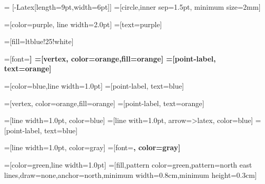\usetikzlibrary{positioning,arrows.meta,shapes,calc,patterns}

 = [-{Latex[length=9pt,width=6pt]}]
=[circle,inner sep=1.5pt, minimum size=2mm]

=[color=purple, line width=2.0pt]
=[text=purple]

=[fill=ltblue!25!white]

=[font=\bfseries]
=[vertex, color=orange,fill=orange]
=[point-label, text=orange]

=[color=blue,line width=1.0pt]
=[point-label, text=blue]


=[vertex, color=orange,fill=orange]
=[point-label, text=orange]

=[line width=1.0pt, color=blue]
=[line with=1.0pt, arrow=>latex, color=blue]
=[point-label, text=blue]


=[line width=1.0pt, color=gray]
=[font=\bfseries, color=gray]


=[color=green,line width=1.0pt]
=[fill,pattern color=green,pattern=north east lines,draw=none,anchor=north,minimum width=0.8cm,minimum height=0.3cm]
